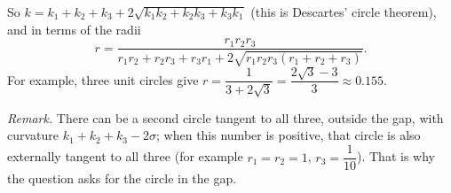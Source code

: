 So $k=k_1+k_2+k_3+2\sqrt{k_1k_2+k_2k_3+k_3k_1}$ (this is Descartes' circle theorem), and in terms of the radii
\[\boxed{r=\dfrac{r_1r_2r_3}{r_1r_2+r_2r_3+r_3r_1+2\sqrt{r_1r_2r_3\left(r_1+r_2+r_3\right)}}} .\]
For example, three unit circles give $r=\dfrac{1}{3+2\sqrt3}=\dfrac{2\sqrt3-3}{3}\approx0.155$.

\emph{Remark.} There can be a second circle tangent to all three, outside the gap, with curvature $k_1+k_2+k_3-2\sigma$; when this number is positive, that circle is also externally tangent to all three (for example $r_1=r_2=1$, $r_3=\dfrac{1}{10}$). That is why the question asks for the circle in the gap.

